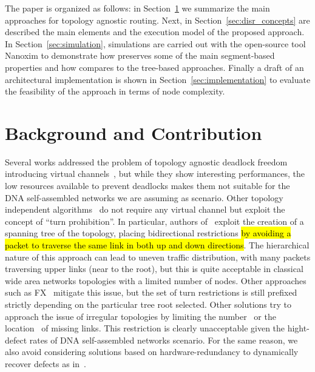 The paper is organized as follows: in Section~\ref{sec:related_works}
we summarize the main approaches for topology agnostic routing. Next, in
Section~\ref{sec:disr_concepts} are described the main elements and
the execution model of the proposed approach. In Section~\ref{sec:simulation},
simulations are carried out with the open-source tool Nanoxim to
demonstrate how \disr{} preserves some of the main segment-based
properties and how compares to the tree-based approaches. Finally a
draft of an architectural implementation is shown in
Section~\ref{sec:implementation} to evaluate the feasibility of the
approach in terms of node complexity.

\section{Background and Contribution}
\label{sec:related_works}
Several works addressed the problem of topology agnostic deadlock
freedom introducing virtual channels~\cite{sancho2002, skeie2002,
skeie2004, koibuchi2003}, but while they show interesting
performances, the low resources available to prevent deadlocks makes them not suitable for
the DNA self-assembled networks we are assuming as
scenario.
Other topology independent algorithms~\cite{schroeder1991,
koibuchi2001, cherkasova1996} do not require any virtual channel but
exploit the concept of ``turn prohibition''.
In particular, authors of~\cite{Patwardhan05evaluatingthe} exploit the creation of a spanning tree of the
topology, placing bidirectional restrictions \hl{by avoiding a packet
to traverse the same link in both up and down directions}.
The hierarchical nature of this approach can lead to uneven traffic
distribution, with many packets traversing upper links (near to the
root), but this is quite acceptable in classical wide area networks
topologies with a limited number of nodes. Other approaches such as
FX~\cite{sancho2000} mitigate this
issue, but the set of turn restrictions is still prefixed
strictly depending on the particular tree root selected. 
Other solutions try to approach the issue of irregular
topologies by limiting the number~\cite{duato1997, gomez2004, koibuchi2008} or the
location~\cite{zhang2008, flich2008, liu2011} of missing links. This
restriction is clearly unacceptable given the hight-defect rates of
DNA self-assembled networks scenario. For the same reason, we also
avoid considering solutions based on hardware-redundancy to
dynamically recover defects as in~\cite{constantinides2006, kohler2010,  park2006, ebrahimi2013}. 


